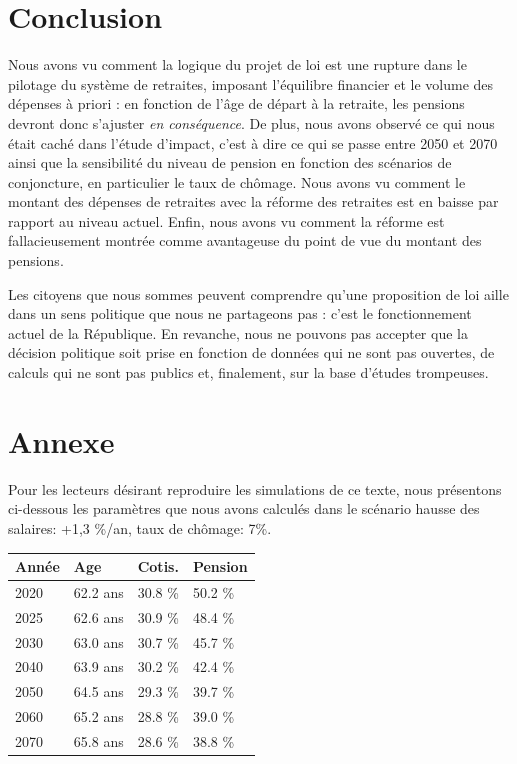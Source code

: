 \documentclass[10pt]{article}
\begin{document}

\section{Conclusion}

Nous avons vu comment la logique du projet de loi est une 
rupture dans le pilotage du système de retraites, 
imposant l'équilibre financier et le volume des dépenses 
à priori : en fonction de l'âge de départ à la retraite, 
les pensions devront donc s'ajuster \emph{en conséquence}. 
De plus, nous avons observé ce qui nous était caché dans l'étude 
d'impact, c'est à dire ce qui se passe entre 2050 et 2070 ainsi que 
la sensibilité du niveau de pension en fonction des scénarios 
de conjoncture, en particulier le taux de chômage. 
Nous avons vu comment le montant des dépenses de retraites avec la réforme 
des retraites est en baisse par rapport au niveau actuel. 
Enfin, nous avons vu comment la réforme est fallacieusement 
montrée comme avantageuse du point de vue du montant des pensions. 

Les citoyens que nous sommes peuvent comprendre qu'une proposition de loi 
aille dans un sens politique que nous ne partageons pas : c'est le 
fonctionnement actuel de la République. 
En revanche, nous ne pouvons pas accepter que la décision politique soit 
prise en fonction de données qui ne sont pas ouvertes, 
de calculs qui ne sont pas publics et, finalement, sur la base d'études trompeuses. 


\section{Annexe}

Pour les lecteurs désirant reproduire les simulations de ce texte, 
nous présentons ci-dessous les paramètres que nous avons calculés dans 
le scénario hausse des salaires: +1,3 \%/an, taux de chômage: 7\%.

\begin{center}
\begin{tabular}{l|lll}
\textbf{Année} & \textbf{Age} & \textbf{Cotis.} & \textbf{Pension} \\
\hline
 2020 & 62.2 ans & 30.8 \% & 50.2 \% \\
 2025 & 62.6 ans & 30.9 \% & 48.4 \% \\
 2030 & 63.0 ans & 30.7 \% & 45.7 \% \\
 2040 & 63.9 ans & 30.2 \% & 42.4 \% \\
 2050 & 64.5 ans & 29.3 \% & 39.7 \% \\
 2060 & 65.2 ans & 28.8 \% & 39.0 \% \\
 2070 & 65.8 ans & 28.6 \% & 38.8 \%
\end{tabular}
\end{center}
\end{document}

